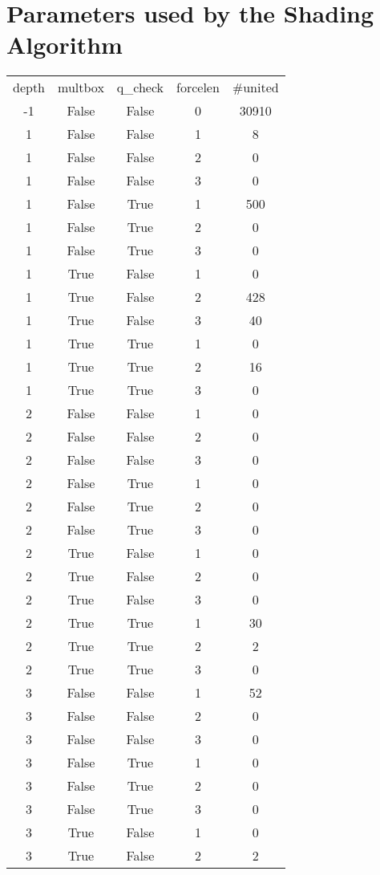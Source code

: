 \documentclass[12pt,reqno]{amsart}
\theoremstyle{plain}
\theoremstyle{definition}
\numberwithin{equation}{section}
\begin{document}
\section{Parameters used by the Shading Algorithm}
\begin{longtable}{ccccc} 
depth & multbox & q\_{}check & forcelen & \#united \\ 
-1 & False & False & 0 & 30910 \\ 
1 & False & False & 1 & 8 \\ 
1 & False & False & 2 & 0 \\ 
1 & False & False & 3 & 0 \\ 
1 & False & True & 1 & 500 \\ 
1 & False & True & 2 & 0 \\ 
1 & False & True & 3 & 0 \\ 
1 & True & False & 1 & 0 \\ 
1 & True & False & 2 & 428 \\ 
1 & True & False & 3 & 40 \\ 
1 & True & True & 1 & 0 \\ 
1 & True & True & 2 & 16 \\ 
1 & True & True & 3 & 0 \\ 
2 & False & False & 1 & 0 \\ 
2 & False & False & 2 & 0 \\ 
2 & False & False & 3 & 0 \\ 
2 & False & True & 1 & 0 \\ 
2 & False & True & 2 & 0 \\ 
2 & False & True & 3 & 0 \\ 
2 & True & False & 1 & 0 \\ 
2 & True & False & 2 & 0 \\ 
2 & True & False & 3 & 0 \\ 
2 & True & True & 1 & 30 \\ 
2 & True & True & 2 & 2 \\ 
2 & True & True & 3 & 0 \\ 
3 & False & False & 1 & 52 \\ 
3 & False & False & 2 & 0 \\ 
3 & False & False & 3 & 0 \\ 
3 & False & True & 1 & 0 \\ 
3 & False & True & 2 & 0 \\ 
3 & False & True & 3 & 0 \\ 
3 & True & False & 1 & 0 \\ 
3 & True & False & 2 & 2 \\ 

\end{longtable}
\end{document}
